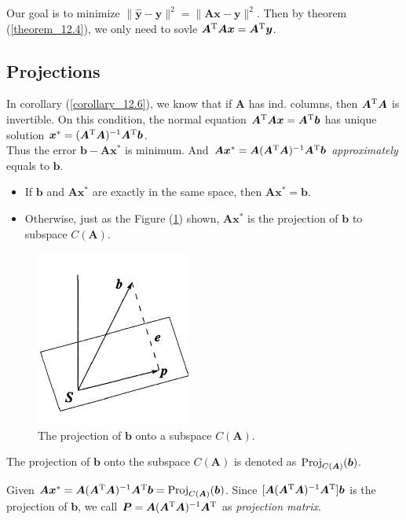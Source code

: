 Our goal is to minimize $\|\hat{\bm y}-\bm y\|^2=\|\bm{Ax}-\bm y\|^2$. Then by theorem (\ref{theorem_12.4}), we only need to sovle $\bm A^{\mathrm T}\bm A\bm x=\bm A^{\mathrm T}\bm y$.
\subsection{Projections}
In corollary (\ref{corollary_12.6}), we know that if $\bm A$ has ind. columns, then $\bm A^{\mathrm T}\bm A$ is invertible. On this condition, the normal equation $\bm A^{\mathrm T}\bm A\bm x=\bm A^{\mathrm T}\bm b$ has unique solution $\bm x^{*}=(\bm A^{\mathrm T}\bm A)^{-1}\bm A^{\mathrm T}\bm b$.\\
Thus the error $\bm b-\bm A\bm x^{*}$ is minimum. And $\bm A\bm x^{*}=\bm A(\bm A^{\mathrm T}\bm A)^{-1}\bm A^{\mathrm T}\bm b$ \emph{approximately} equals to $\bm b$. \\
\begin{itemize}
\item
If $\bm b$ and $\bm{A}\bm x^{*}$ are exactly in the same space, then $\bm{A}\bm x^{*}=\bm b$.
\item
Otherwise, just as the Figure (\ref{figure_12.2}) shown, $\bm A\bm x^{*}$ is the projection of $\bm b$ to subspace $C(\bm A)$.
\end{itemize}
\begin{figure}[H]\centering
\includegraphics{week5/projection}
\caption{The projection of $\bm b$ onto a subspace $C(\bm A)$.}\label{figure_12.2}\end{figure}
\begin{definition}[Projection]
The projection of $\bm b$ onto the subspace $C(\bm A)$ is denoted as $\operatorname{Proj}_{C(\bm A)}(\bm b)$.
\end{definition}
\begin{definition}
Given $\bm A\bm x^{*}=\bm A(\bm A^{\mathrm T}\bm A)^{-1}\bm A^{\mathrm T}\bm b=\operatorname{Proj}_{C(\bm A)}(\bm b)$. Since $[\bm A(\bm A^{\mathrm T}\bm A)^{-1}\bm A^{\mathrm T}]\bm b$ is the projection of $\bm b$, we call $\bm P=\bm A(\bm A^{\mathrm T}\bm A)^{-1}\bm A^{\mathrm T}$ as \emph{projection matrix}.
\end{definition}
